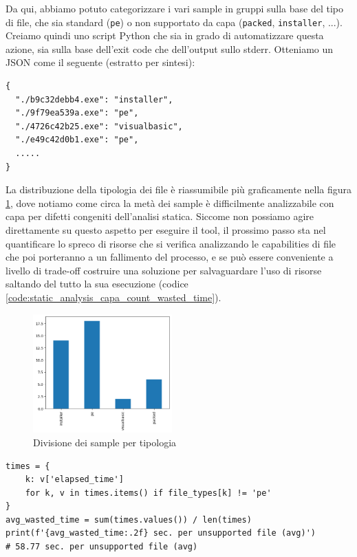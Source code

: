 Da qui, abbiamo potuto categorizzare i vari sample in gruppi sulla base del tipo di file, che sia standard (\texttt{pe}) o non supportato da capa (\texttt{packed}, \texttt{installer}, ...).
Creiamo quindi uno script Python che sia in grado di automatizzare questa azione, sia sulla base dell'exit code che dell'output sullo stderr. Otteniamo un JSON come il seguente (estratto per sintesi):

\begin{verbatim}
{
  "./b9c32debb4.exe": "installer",
  "./9f79ea539a.exe": "pe",
  "./4726c42b25.exe": "visualbasic",
  "./e49c42d0b1.exe": "pe",
  .....
}
\end{verbatim}

La distribuzione della tipologia dei file è riassumibile più graficamente nella figura \ref{fig:capa_file_type_split}, dove notiamo come circa la metà dei sample è difficilmente analizzabile con capa per difetti congeniti dell'analisi statica.
Siccome non possiamo agire direttamente su questo aspetto per eseguire il tool, il prossimo passo sta nel quantificare lo spreco di risorse che si verifica analizzando le capabilities di file che poi porteranno a un fallimento del processo, e se può essere conveniente a livello di trade-off costruire una soluzione per salvaguardare l'uso di risorse saltando del tutto la sua esecuzione (codice \ref{code:static_analysis_capa_count_wasted_time}).

\begin{figure}[!htb]
    \centering
    \includegraphics[height=1.8in]{assets/capa_file_type_split.png}
    \caption{Divisione dei sample per tipologia}
    \label{fig:capa_file_type_split}
\end{figure}

\begin{code}
\caption{Calcolo del tempo sprecato eseguendo capa su file non supportati}
\begin{verbatim}
times = {
    k: v['elapsed_time']
    for k, v in times.items() if file_types[k] != 'pe'
}
avg_wasted_time = sum(times.values()) / len(times)
print(f'{avg_wasted_time:.2f} sec. per unsupported file (avg)')
# 58.77 sec. per unsupported file (avg)
\end{verbatim}
\label{code:static_analysis_capa_count_wasted_time}
\end{code}

